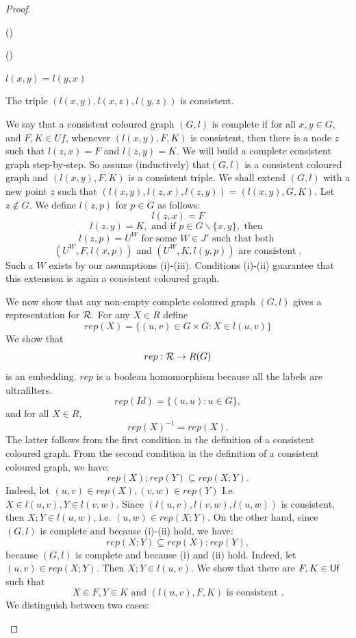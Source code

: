 \documentclass[12pt]{article}
\newcounter{item}[section]
\newcounter{kirshr}
\newcounter{kirshb}
\newenvironment{enumroman}{\setcounter{kirshr}{1}
\begin{list}{(\roman{kirshr})}{\usecounter{kirshr}} }{\end{list}}
\newenvironment{enumarab}{\setcounter{kirshb}{1}
\begin{list}{(\arabic{kirshb})}{\usecounter{kirshb}} }{\end{list}}
\theoremstyle{definition}
\def\Uf{{\sf Uf}}
\begin{document}
\begin{proof}
\begin{enumarab}
\begin{enumroman}
\item $l(x,y)=l(y,x)$

\item The triple $(l(x,y),l(x,z),l(y,z))$ is consistent.

\end{enumroman}

We say that a consistent coloured graph $(G,l)$ is complete if for all
$x,y\in G$, and $F,K\in Uf$, whenever
$(l(x,y),F,K)$ is consistent, then there is a node $z$ such that
$l(z,x)=F$ and $l(z,y)=K$.
We will build a complete consistent graph step-by-step. So assume (inductively)
that$(G,l)$ is a consistent coloured graph and $(l(x,y), F, K)$ is a consistent triple.
We shall extend $(G,l)$ with a new point $z$ such that $(l(x,y), l(z,x), l(z,y)) =(l(x,y),G,K).$
Let $z\notin G.$ We define $l(z,p)$ for $p\in G$ as follows:
$$l(z,x)=F$$
$$l(z,y)=K, \text { and if } p\in G\smallsetminus \{x,y\}, \text { then }$$
$$l(z,p)=U^W\text { for some }W\in J' \text { such that both }$$
$$(U^W, F, l(x,p))\text { and } (U^W, K, l(y,p))\text { are consistent }.$$
Such a $W$ exists by our assumptions (i)-(iii).
Conditions (i)-(ii) guarantee that this extension is again a consistent coloured graph.





We now show that any non-empty complete coloured graph $(G,l)$ gives a representation
for $\cal R.$ For any $X\in R$ define
$$rep(X)=\{(u,v)\in G\times G: X\in l(u,v)\}$$
We show that
$$rep:{\cal R}\to R(G)$$
is an embedding. $rep$ is a boolean homomorphism
because all the labels are ultrafilters.
$$rep(Id)=\{(u,u): u\in G\},$$
and for all $X\in R$,
$$rep(X)^{-1}=rep(X).$$
The latter follows from the first condition in the definition of a consistent coloured graph.
From the second condition in the definition of a consistent coloured graph, we have:
$$rep(X);rep(Y)\subseteq rep(X;Y).$$
Indeed, let $(u,v)\in rep(X), (v,w)\in rep(Y)$ I.e. $X\in l(u,v), Y\in l(v,w).$
Since $(l(u,v), l(v,w), l(u,w))$ is consistent, then $X;Y\in l(u,w)$, i.e. $(u,w)\in
rep(X;Y).$
On the other hand, since $(G,l)$ is complete and because (i)-(ii) hold, we have:
$$rep(X;Y)\subseteq rep(X);rep(Y),$$
because $(G,l)$ is complete and because (i) and (ii) hold.
Indeed, let $(u,v)\in rep(X;Y)$. Then $X;Y\in l(u,v)$.
We show that there are $F,K\in \Uf$ such that
$$X\in F, Y\in K \text { and } (l(u,v), F,K)\text { is consistent }.$$
We distinguish between two cases:


\end{enumarab}
\end{proof}
\end{document}
